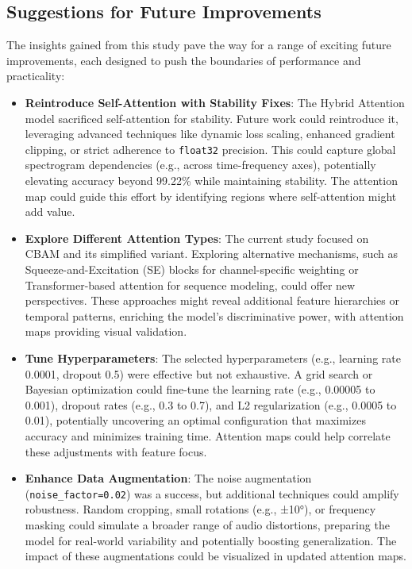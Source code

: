 \documentclass[12pt]{article}
\begin{document}
\subsection{Suggestions for Future Improvements}
The insights gained from this study pave the way for a range of exciting future improvements, each designed to push the boundaries of performance and practicality:
\begin{itemize}
    \item \textbf{Reintroduce Self-Attention with Stability Fixes}: The Hybrid Attention model sacrificed self-attention for stability. Future work could reintroduce it, leveraging advanced techniques like dynamic loss scaling, enhanced gradient clipping, or strict adherence to \texttt{float32} precision. This could capture global spectrogram dependencies (e.g., across time-frequency axes), potentially elevating accuracy beyond 99.22\% while maintaining stability. The attention map could guide this effort by identifying regions where self-attention might add value.
    \item \textbf{Explore Different Attention Types}: The current study focused on CBAM and its simplified variant. Exploring alternative mechanisms, such as Squeeze-and-Excitation (SE) blocks for channel-specific weighting or Transformer-based attention for sequence modeling, could offer new perspectives. These approaches might reveal additional feature hierarchies or temporal patterns, enriching the model's discriminative power, with attention maps providing visual validation.
    \item \textbf{Tune Hyperparameters}: The selected hyperparameters (e.g., learning rate 0.0001, dropout 0.5) were effective but not exhaustive. A grid search or Bayesian optimization could fine-tune the learning rate (e.g., 0.00005 to 0.001), dropout rates (e.g., 0.3 to 0.7), and L2 regularization (e.g., 0.0005 to 0.01), potentially uncovering an optimal configuration that maximizes accuracy and minimizes training time. Attention maps could help correlate these adjustments with feature focus.
    \item \textbf{Enhance Data Augmentation}: The noise augmentation (\texttt{noise\_factor=0.02}) was a success, but additional techniques could amplify robustness. Random cropping, small rotations (e.g., ±10°), or frequency masking could simulate a broader range of audio distortions, preparing the model for real-world variability and potentially boosting generalization. The impact of these augmentations could be visualized in updated attention maps.

\end{itemize}
\end{document}
